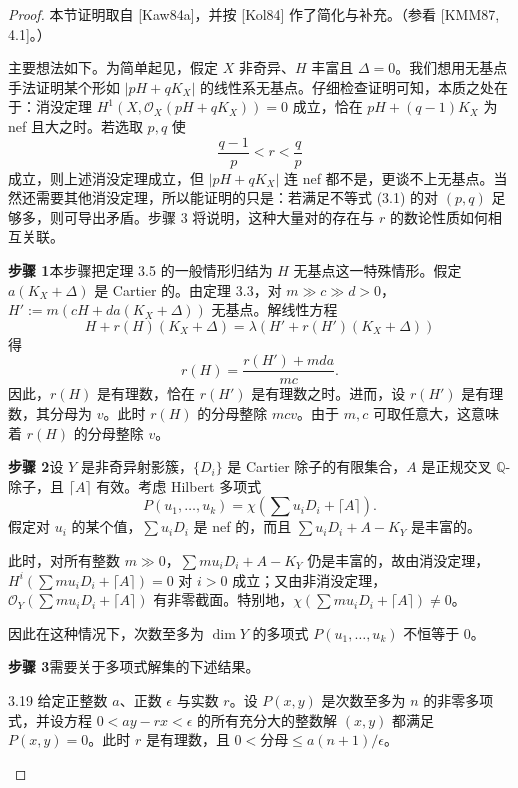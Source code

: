 \begin{proof}
本节证明取自 [Kaw84a]，并按 [Kol84] 作了简化与补充。（参看 [KMM87, 4.1]。）

主要想法如下。为简单起见，假定 $X$ 非奇异、$H$ 丰富且 $\Delta=0$。我们想用无基点手法证明某个形如 $|pH+qK_X|$ 的线性系无基点。仔细检查证明可知，本质之处在于：消没定理 $H^1(X,\mathcal{O}_X(pH+qK_X))=0$ 成立，恰在 $pH+(q-1)K_X$ 为 nef 且大之时。若选取 $p,q$ 使
\begin{equation}
\frac{q-1}{p}<r<\frac{q}{p}
\tag{3.1}
\end{equation}
成立，则上述消没定理成立，但 $|pH+qK_X|$ 连 nef 都不是，更谈不上无基点。当然还需要其他消没定理，所以能证明的只是：若满足不等式 (3.1) 的对 $(p,q)$ 足够多，则可导出矛盾。步骤 3 将说明，这种大量对的存在与 $r$ 的数论性质如何相互关联。

\par\medskip\noindent\textbf{步骤 1}\quad 本步骤把定理 3.5 的一般情形归结为 $H$ 无基点这一特殊情形。假定 $a(K_X+\Delta)$ 是 Cartier 的。由定理 3.3，对 $m\gg c\gg d>0$，$H':=m(cH+da(K_X+\Delta))$ 无基点。解线性方程
\[
H+r(H)(K_X+\Delta)=\lambda\left(H'+r(H')(K_X+\Delta)\right)
\]
得
\[
r(H)=\frac{r(H')+mda}{mc}.
\]
因此，$r(H)$ 是有理数，恰在 $r(H')$ 是有理数之时。进而，设 $r(H')$ 是有理数，其分母为 $v$。此时 $r(H)$ 的分母整除 $mcv$。由于 $m,c$ 可取任意大，这意味着 $r(H)$ 的分母整除 $v$。

\par\medskip\noindent\textbf{步骤 2}\quad 设 $Y$ 是非奇异射影簇，$\{D_i\}$ 是 Cartier 除子的有限集合，$A$ 是正规交叉 $\mathbb{Q}$-除子，且 $\lceil A\rceil$ 有效。考虑 Hilbert 多项式
\[
P(u_1,\dots,u_k)=\chi\left(\sum u_iD_i+\lceil A\rceil\right).
\]
假定对 $u_i$ 的某个值，$\sum u_iD_i$ 是 nef 的，而且 $\sum u_iD_i+A-K_Y$ 是丰富的。

此时，对所有整数 $m\gg 0$，$\sum mu_iD_i+A-K_Y$ 仍是丰富的，故由消没定理，$H^i(\sum mu_iD_i+\lceil A\rceil)=0$ 对 $i>0$ 成立；又由非消没定理，$\mathcal{O}_Y(\sum mu_iD_i+\lceil A\rceil)$ 有非零截面。特别地，$\chi(\sum mu_iD_i+\lceil A\rceil)\neq 0$。

因此在这种情况下，次数至多为 $\dim Y$ 的多项式 $P(u_1,\dots,u_k)$ 不恒等于 $0$。

\par\medskip\noindent\textbf{步骤 3}\quad 需要关于多项式解集的下述结果。

\begin{lemmap}{3.19}
给定正整数 $a$、正数 $\epsilon$ 与实数 $r$。设 $P(x,y)$ 是次数至多为 $n$ 的非零多项式，并设方程 $0<ay-rx<\epsilon$ 的所有充分大的整数解 $(x,y)$ 都满足 $P(x,y)=0$。此时 $r$ 是有理数，且 $0<\text{分母}\leq a(n+1)/\epsilon$。
\end{lemmap}


\end{proof}
